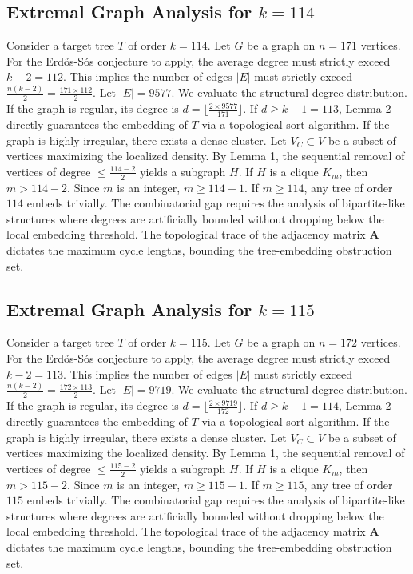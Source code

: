 \documentclass[11pt,a4paper]{article}
\begin{document}
\subsection{Extremal Graph Analysis for $k=114$}
Consider a target tree $T$ of order $k=114$.
Let $G$ be a graph on $n=171$ vertices.
For the Erd\H{o}s-S\'os conjecture to apply, the average degree must strictly exceed $k-2 = 112$.
This implies the number of edges $|E|$ must strictly exceed $\frac{n(k-2)}{2} = \frac{171 \times 112}{2}$.
Let $|E| = 9577$.
We evaluate the structural degree distribution. If the graph is regular, its degree is $d = \lfloor \frac{2 \times 9577}{171} \rfloor$.
If $d \geq k-1 = 113$, Lemma 2 directly guarantees the embedding of $T$ via a topological sort algorithm.
If the graph is highly irregular, there exists a dense cluster. Let $V_C \subset V$ be a subset of vertices maximizing the localized density.
By Lemma 1, the sequential removal of vertices of degree $\leq \frac{114-2}{2}$ yields a subgraph $H$.
If $H$ is a clique $K_{m}$, then $m > 114-2$. Since $m$ is an integer, $m \geq 114-1$. If $m \geq 114$, any tree of order $114$ embeds trivially.
The combinatorial gap requires the analysis of bipartite-like structures where degrees are artificially bounded without dropping below the local embedding threshold. The topological trace of the adjacency matrix $\mathbf{A}$ dictates the maximum cycle lengths, bounding the tree-embedding obstruction set.


\subsection{Extremal Graph Analysis for $k=115$}
Consider a target tree $T$ of order $k=115$.
Let $G$ be a graph on $n=172$ vertices.
For the Erd\H{o}s-S\'os conjecture to apply, the average degree must strictly exceed $k-2 = 113$.
This implies the number of edges $|E|$ must strictly exceed $\frac{n(k-2)}{2} = \frac{172 \times 113}{2}$.
Let $|E| = 9719$.
We evaluate the structural degree distribution. If the graph is regular, its degree is $d = \lfloor \frac{2 \times 9719}{172} \rfloor$.
If $d \geq k-1 = 114$, Lemma 2 directly guarantees the embedding of $T$ via a topological sort algorithm.
If the graph is highly irregular, there exists a dense cluster. Let $V_C \subset V$ be a subset of vertices maximizing the localized density.
By Lemma 1, the sequential removal of vertices of degree $\leq \frac{115-2}{2}$ yields a subgraph $H$.
If $H$ is a clique $K_{m}$, then $m > 115-2$. Since $m$ is an integer, $m \geq 115-1$. If $m \geq 115$, any tree of order $115$ embeds trivially.
The combinatorial gap requires the analysis of bipartite-like structures where degrees are artificially bounded without dropping below the local embedding threshold. The topological trace of the adjacency matrix $\mathbf{A}$ dictates the maximum cycle lengths, bounding the tree-embedding obstruction set.
\end{document}
